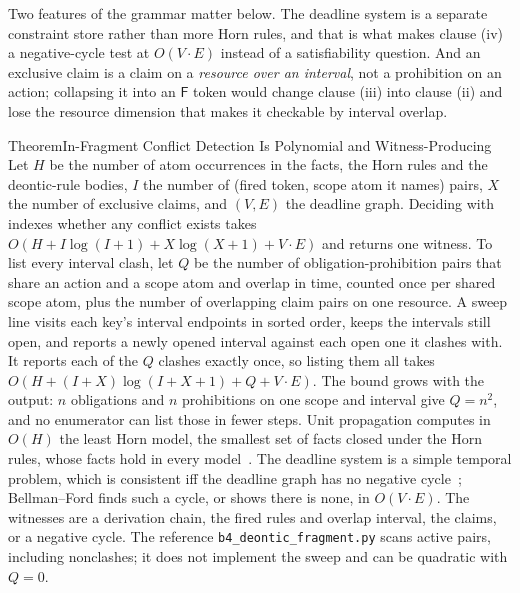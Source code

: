 \documentclass[11pt,a4paper]{article}
\theoremstyle{definition}
\theoremstyle{definition}
\theoremstyle{remark}
\begin{document}
\noindent Two features of the grammar matter below. The deadline system is a
separate constraint store rather than more Horn rules, and that is what makes
clause (iv) a negative-cycle test at $O(V\cdot E)$ instead of a satisfiability
question. And an exclusive claim is a claim on a \emph{resource over an
interval}, not a prohibition on an action; collapsing it into an $\mathsf{F}$
token would change clause (iii) into clause (ii) and lose the resource
dimension that makes it checkable by interval overlap.

\begin{pdclaim}{Theorem}{In-Fragment Conflict Detection Is Polynomial and Witness-Producing}
\setlength{\parskip}{4pt plus 1pt}
\label{thm:deontic-detect}
Let $H$ be the number of atom occurrences in the facts, the Horn rules and
the deontic-rule bodies, $I$ the number of (fired token, scope atom it names)
pairs, $X$ the number of exclusive claims, and $(V,E)$ the deadline graph.
Deciding with indexes whether any conflict exists takes
$O(H+I\log(I+1)+X\log(X+1)+V\cdot E)$ and returns one witness. To list every
interval clash, let $Q$ be the number of obligation-prohibition
pairs that share an action and a scope atom and overlap in time, counted once
per shared scope atom, plus the number of overlapping claim pairs on one
resource. A sweep line visits each key's interval endpoints in sorted order,
keeps the intervals still open, and reports a newly opened interval against
each open one it clashes with. It reports each of the $Q$ clashes exactly
once, so listing them all takes $O(H+(I+X)\log(I+X+1)+Q+V\cdot E)$. The bound
grows with the output: $n$ obligations and $n$ prohibitions on one scope and
interval give $Q=n^2$, and no enumerator can list those in fewer steps.
Unit propagation computes in $O(H)$ the least Horn
model, the smallest set of facts closed under the Horn rules, whose facts
hold in every model~. The deadline system is a simple temporal
problem, which is consistent iff the deadline graph has no negative
cycle~; Bellman--Ford finds such a cycle, or shows there is none,
in $O(V\cdot E)$.
The witnesses are a derivation chain, the fired rules and overlap interval,
the claims, or a negative cycle. The reference
\texttt{b4\_deontic\_fragment.py} scans active pairs, including nonclashes;
it does not implement the sweep and can be quadratic with $Q=0$.
\end{pdclaim}
\end{document}

